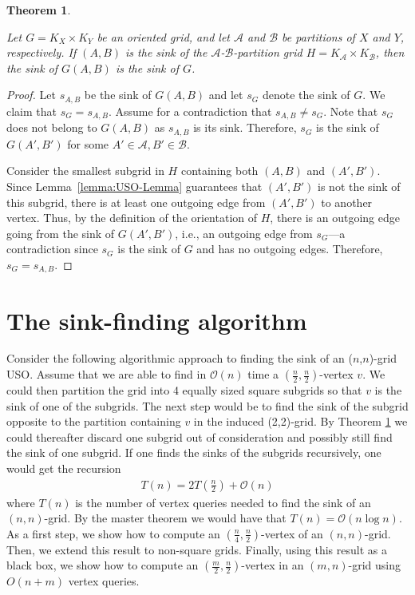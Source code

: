 \documentclass[a4paper,10pt]{article}
\newtheorem{theorem}{Theorem}
\newcommand{\A}{\ensuremath{\mathcal A}}
\newcommand{\B}{\ensuremath{\mathcal B}}
\newcommand{\s}[1]{\ensuremath{s_{\scriptscriptstyle#1}}}
\begin{document}
\begin{theorem}
\label{thm:the_sink_of_the_sink_of_the_induced_orientation_is_the_global_sink}

Let $G = K_X \times K_Y$ be an oriented grid,
and let $\A$ and $\B$ be partitions of $X$ and $Y$, respectively.
If $(A,B)$ is the sink of the $\A$-$\B$-partition grid $H = K_\A \times K_\B$, then the sink of $G(A,B)$ is the sink of $G$.
\end{theorem}
\begin{proof}
Let $\s{A,B}$ be the sink of $G(A,B)$ and let $\s{G}$ denote the sink of $G$.
We claim that $\s{G} = \s{A,B}$.
Assume for a contradiction that $\s{A,B}\neq \s{G}$.
Note that $\s{G}$ does not belong to $G(A,B)$ as $\s{A,B}$ is its sink.
Therefore, $\s{G}$ is the sink of $G(A', B')$ for some $A'\in \A, B'\in \B$.

Consider the smallest subgrid in $H$ containing both $(A,B)$ and $(A', B')$. 
Since Lemma~\ref{lemma:USO-Lemma} guarantees that $(A',B')$ is not the sink of this subgrid, there is at least one outgoing edge from $(A',B')$ to another vertex.
Thus, by the definition of the orientation of $H$, there is an outgoing edge going from the sink of $G(A',B')$, i.e., an outgoing edge from $\s{G}$---a contradiction since $\s{G}$ is the sink of $G$ and has no outgoing edges. 
Therefore, $\s{G} = \s{A,B}$.
\end{proof}



\section{The sink-finding algorithm}

Consider the following algorithmic approach to finding the sink of an ($n$,$n$)-grid USO. 
Assume that we are able to find in $\mathcal{O}(n)$ time a $(\frac{n}{2}, \frac{n}{2})$-vertex $v$.
We could then partition the grid into 4 equally sized square subgrids so that $v$ is the sink of one of the subgrids.
The next step would be to find the sink of the subgrid opposite to the partition containing $v$ in the induced (2,2)-grid. 
By Theorem \ref{thm:the_sink_of_the_sink_of_the_induced_orientation_is_the_global_sink} we could thereafter discard one subgrid out of consideration and possibly still find the sink of one subgrid. 
If one finds the sinks of the subgrids recursively, one would get the recursion
\begin{align*}
 T(n) = 2T\left(\frac{n}{2}\right) + \mathcal{O}(n)
\end{align*}
where $T(n)$ is the number of vertex queries needed to find the sink of an $(n,n)$-grid. By the master theorem we would have that $T(n) = \mathcal{O}(n\log n)$. 
As a first step, we show how to compute an $(\frac{n}{4}, \frac{n}{2})$-vertex of an $(n, n)$-grid. Then, we extend this result to non-square grids. Finally, using this result as a black box, we show how to compute an $(\frac{m}{2}, \frac{n}{2})$-vertex in an $(m,n)$-grid using $O(n+m)$ vertex queries. 
\end{document}
